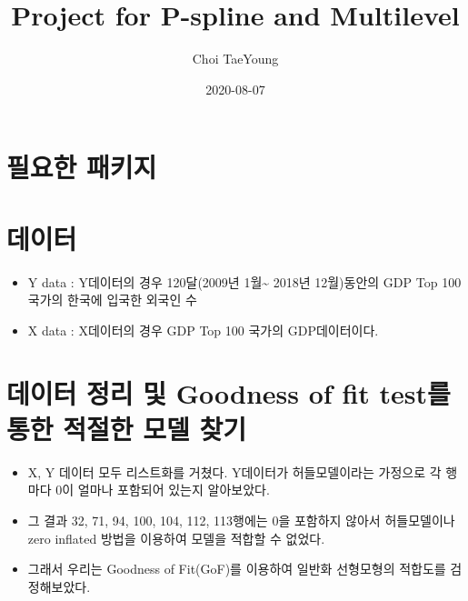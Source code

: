 \documentclass[
]{article}
\title{Project for P-spline and Multilevel}
\author{Choi TaeYoung}
\date{2020-08-07}
\providecommand{\tightlist}{%
  \setlength{\itemsep}{0pt}\setlength{\parskip}{0pt}}
\begin{document}
\maketitle

{
\setcounter{tocdepth}{2}
\tableofcontents
}
\hypertarget{uxd544uxc694uxd55c-uxd328uxd0a4uxc9c0}{%
\section{필요한 패키지}\label{uxd544uxc694uxd55c-uxd328uxd0a4uxc9c0}}

\newpage

\hypertarget{uxb370uxc774uxd130}{%
\section{데이터}\label{uxb370uxc774uxd130}}

\begin{itemize}
\item
  Y data : Y데이터의 경우 120달(2009년 1월\textasciitilde{} 2018년 12월)동안의 GDP Top 100 국가의 한국에 입국한 외국인 수
\item
  X data : X데이터의 경우 GDP Top 100 국가의 GDP데이터이다.
\end{itemize}

\hypertarget{uxb370uxc774uxd130-uxc815uxb9ac-uxbc0f-goodness-of-fit-testuxb97c-uxd1b5uxd55c-uxc801uxc808uxd55c-uxbaa8uxb378-uxcc3euxae30}{%
\section{데이터 정리 및 Goodness of fit test를 통한 적절한 모델 찾기}\label{uxb370uxc774uxd130-uxc815uxb9ac-uxbc0f-goodness-of-fit-testuxb97c-uxd1b5uxd55c-uxc801uxc808uxd55c-uxbaa8uxb378-uxcc3euxae30}}

\begin{itemize}
\tightlist
\item
  X, Y 데이터 모두 리스트화를 거쳤다. Y데이터가 허들모델이라는 가정으로 각 행마다 0이 얼마나 포함되어 있는지 알아보았다.
\item
  그 결과 32, 71, 94, 100, 104, 112, 113행에는 0을 포함하지 않아서 허들모델이나 zero inflated 방법을 이용하여 모델을 적합할 수 없었다.
\item
  그래서 우리는 Goodness of Fit(GoF)를 이용하여 일반화 선형모형의 적합도를 검정해보았다.
\end{itemize}
\end{document}
